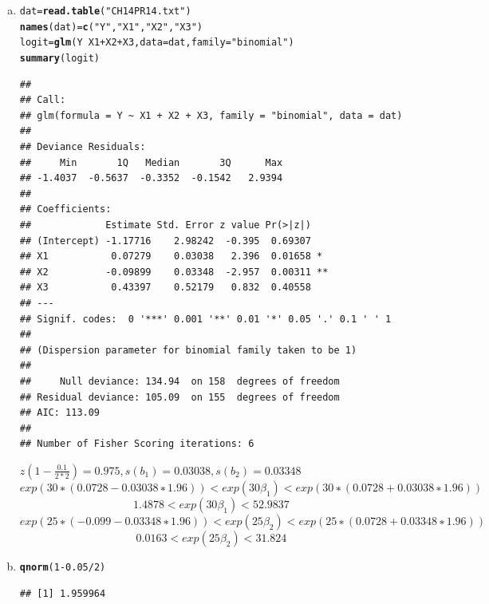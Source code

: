\documentclass{article}\usepackage[]{graphicx}\usepackage[]{color}
\makeatletter
\newcommand{\hlnum}[1]{\textcolor[rgb]{0.686,0.059,0.569}{#1}}%
\newcommand{\hlstr}[1]{\textcolor[rgb]{0.192,0.494,0.8}{#1}}%
\newcommand{\hlopt}[1]{\textcolor[rgb]{0,0,0}{#1}}%
\newcommand{\hlstd}[1]{\textcolor[rgb]{0.345,0.345,0.345}{#1}}%
\newcommand{\hlkwb}[1]{\textcolor[rgb]{0.69,0.353,0.396}{#1}}%
\newcommand{\hlkwc}[1]{\textcolor[rgb]{0.333,0.667,0.333}{#1}}%
\newcommand{\hlkwd}[1]{\textcolor[rgb]{0.737,0.353,0.396}{\textbf{#1}}}%
\newenvironment{kframe}{%
 \def\at@end@of@kframe{}%
 \ifinner\ifhmode%
  \def\at@end@of@kframe{\end{minipage}}%
  \begin{minipage}{\columnwidth}%
 \fi\fi%
 \def\FrameCommand##1{\hskip\@totalleftmargin \hskip-\fboxsep
 \colorbox{shadecolor}{##1}\hskip-\fboxsep
     \hskip-\linewidth \hskip-\@totalleftmargin \hskip\columnwidth}%
 \MakeFramed {\advance\hsize-\width
   \@totalleftmargin\z@ \linewidth\hsize
   \@setminipage}}%
 {\par\unskip\endMakeFramed%
 \at@end@of@kframe}
\newenvironment{knitrout}{}{} %
\makeatother
\begin{document}
\begin{enumerate}[(a)]

\item

\begin{knitrout}
\color{fgcolor}\begin{kframe}
\begin{alltt}
  \hlstd{dat} \hlkwb{=} \hlkwd{read.table}\hlstd{(}\hlstr{"CH14PR14.txt"}\hlstd{)}
  \hlkwd{names}\hlstd{(dat)} \hlkwb{=} \hlkwd{c}\hlstd{(}\hlstr{"Y"}\hlstd{,} \hlstr{"X1"}\hlstd{,} \hlstr{"X2"}\hlstd{,} \hlstr{"X3"}\hlstd{)}
  \hlstd{logit} \hlkwb{=} \hlkwd{glm}\hlstd{(Y} \hlopt{~} \hlstd{X1} \hlopt{+} \hlstd{X2} \hlopt{+} \hlstd{X3,} \hlkwc{data} \hlstd{= dat,} \hlkwc{family} \hlstd{=} \hlstr{"binomial"}\hlstd{)}
  \hlkwd{summary}\hlstd{(logit)}
\end{alltt}
\begin{verbatim}
## 
## Call:
## glm(formula = Y ~ X1 + X2 + X3, family = "binomial", data = dat)
## 
## Deviance Residuals: 
##     Min       1Q   Median       3Q      Max  
## -1.4037  -0.5637  -0.3352  -0.1542   2.9394  
## 
## Coefficients:
##             Estimate Std. Error z value Pr(>|z|)   
## (Intercept) -1.17716    2.98242  -0.395  0.69307   
## X1           0.07279    0.03038   2.396  0.01658 * 
## X2          -0.09899    0.03348  -2.957  0.00311 **
## X3           0.43397    0.52179   0.832  0.40558   
## ---
## Signif. codes:  0 '***' 0.001 '**' 0.01 '*' 0.05 '.' 0.1 ' ' 1
## 
## (Dispersion parameter for binomial family taken to be 1)
## 
##     Null deviance: 134.94  on 158  degrees of freedom
## Residual deviance: 105.09  on 155  degrees of freedom
## AIC: 113.09
## 
## Number of Fisher Scoring iterations: 6
\end{verbatim}
\end{kframe}
\end{knitrout}

\qquad $z(1-\frac{0.1}{2*2})=0.975, s(b_1)=0.03038, s(b_2)=0.03348$
$$exp(30∗(0.0728−0.03038∗1.96))<exp(30\beta_1)<exp(30∗(0.0728+0.03038∗1.96))$$
$$1.4878<exp(30\beta_1)<52.9837$$
$$exp(25∗(−0.099−0.03348∗1.96))<exp(25\beta_2)<exp(25∗(0.0728+0.03348∗1.96))$$
$$0.0163 <exp(25\beta_2)< 31.824$$
\item

\begin{knitrout}
\color{fgcolor}\begin{kframe}
\begin{alltt}
  \hlkwd{qnorm}\hlstd{(}\hlnum{1}\hlopt{-}\hlnum{0.05}\hlopt{/}\hlnum{2}\hlstd{)}
\end{alltt}
\begin{verbatim}
## [1] 1.959964
\end{verbatim}
\end{kframe}
\end{knitrout}


\end{enumerate}
\end{document}
